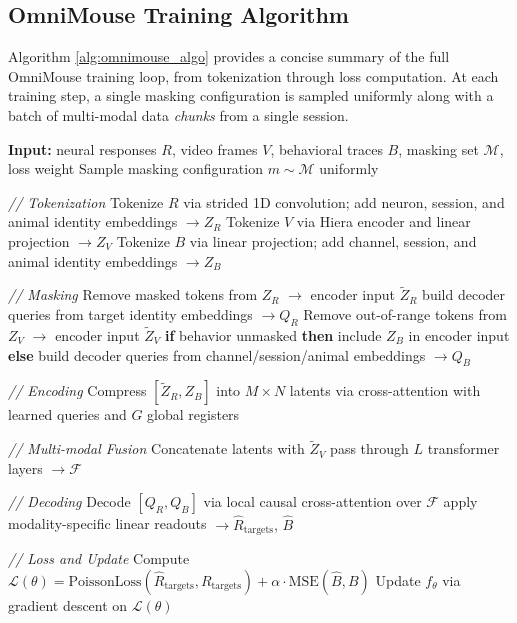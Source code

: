 \documentclass{article} %
\begin{document}
\subsection{OmniMouse Training Algorithm}\label{sec:appendix_algo}

Algorithm \cref{alg:omnimouse_algo} provides a concise summary of the full OmniMouse training loop, from tokenization through loss computation. At each training step, a single masking configuration is sampled uniformly along with a batch of multi-modal data \textit{chunks} from a single session.


\begin{algorithm}
\label{alg:omnimouse_algo}
\caption{Train OmniMouse}
\small
\begin{algorithmic}

\State \textbf{Input:} neural responses $R$, video frames $V$, behavioral traces $B$, masking set $\mathcal{M}$, loss weight \alpha
\State Sample masking configuration $m \sim \mathcal{M}$ uniformly

\State \textit{// Tokenization}
\State Tokenize $R$ via strided 1D convolution; add neuron, session, and animal identity embeddings $\to Z_R$
\State Tokenize $V$ via Hiera encoder and linear projection $\to Z_V$
\State Tokenize $B$ via linear projection; add channel, session, and animal identity embeddings $\to Z_B$

\State \textit{// Masking}
\State Remove masked tokens from $Z_R$ $\to$ encoder input $\widetilde{Z}_R$ 
\State build decoder queries from target identity embeddings $\to Q_R$
\State Remove out-of-range tokens from $Z_V$ $\to$ encoder input $\widetilde{Z}_V$
\State \textbf{if} behavior unmasked \textbf{then} include $Z_B$ in encoder input 
\State \textbf{else} build decoder queries from channel/session/animal embeddings $\to Q_B$

\State \textit{// Encoding}
\State Compress $[\widetilde{Z}_R, Z_B]$ into $M{\times}N$ latents via cross-attention with learned queries and $G$ global registers

\State \textit{// Multi-modal Fusion}
\State Concatenate latents with $\widetilde{Z}_V$
\State pass through $L$ transformer layers $\to \mathcal{F}$

\State \textit{// Decoding}
\State Decode $[Q_R, Q_B]$ via local causal cross-attention over $\mathcal{F}$ 
\State apply modality-specific linear readouts $\to \hat{R}_{\text{targets}},\, \hat{B}$

\State \textit{// Loss and Update}
\State Compute $\mathcal{L}(\theta) = \text{PoissonLoss}(\hat{R}_{\text{targets}}, R_{\text{targets}}) + \alpha\cdot\text{MSE}(\hat{B}, B)$
\State Update $f_\theta$ via gradient descent on $\mathcal{L}(\theta)$

\end{algorithmic}
\end{algorithm}
\end{document}
